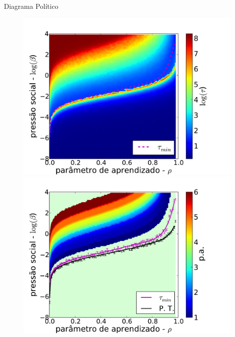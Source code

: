 \documentclass{beamer}
\begin{document}
   \begin{frame}{Diagrama Político}%
       \begin{figure}
           \centering
           \includegraphics[scale=0.25]{Figures/tempocor_line.pdf}
           \quad
           \includegraphics[scale=0.25]{Figures/padiag2.pdf}
       \end{figure}
   \end{frame}%
\end{document}

